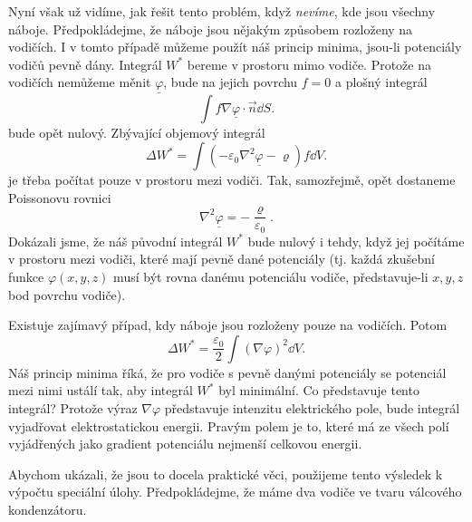     Nyní však už vidíme, jak řešit tento problém, když \emph{nevíme}, kde jsou všechny náboje.
    Předpokládejme, že náboje jsou nějakým způsobem rozloženy na vodičích. I v tomto případě můžeme
    použít náš princip minima, jsou-li potenciály vodičů pevně dány. Integrál \(W^*\) bereme v
    prostoru mimo vodiče. Protože na vodičích nemůžeme měnit \(\underline{\varphi}\), bude na jejich
    povrchu \(f= 0\) a plošný integrál
    \begin{equation*}
      \int f\nabla\underline{\varphi}\cdot\vec{n}\dd{S}.
    \end{equation*}
    bude opět nulový. Zbývající objemový integrál
    \begin{equation*}
      \Delta W^* = \int(-\varepsilon_0\nabla^2\underline{\varphi} - \varrho)f\dd{V}.
    \end{equation*}
    je třeba počítat pouze v prostoru mezi vodiči. Tak, samozřejmě, opět dostaneme Poissonovu
    rovnici
    \begin{equation*}
      \nabla^2\underline{\varphi} = -\dfrac{\varrho}{\varepsilon_0}.
    \end{equation*}
    Dokázali jsme, že náš původní integrál \(W^*\) bude nulový i tehdy, když jej počítáme v prostoru
    mezi vodiči, které mají pevně dané potenciály (tj. každá zkušební funkce \(\varphi(x, y, z)\)
    musí být rovna danému potenciálu vodiče, představuje-li \(x, y, z\) bod povrchu vodiče). 
    
    Existuje zajímavý případ, kdy náboje jsou rozloženy pouze na vodičích. Potom
    \begin{equation*}
      \Delta W^* = \dfrac{\varepsilon_0}{2}\int(\nabla\varphi)^2\dd{V}.
    \end{equation*}
    Náš princip minima říká, že pro vodiče s pevně danými potenciály se potenciál mezi nimi ustálí
    tak, aby integrál \(W^*\) byl minimální. Co představuje tento integrál? Protože výraz
    \(\nabla\varphi\) představuje intenzitu elektrického pole, bude integrál vyjadřovat
    elektrostatickou energii. Pravým polem je to, které má ze všech polí vyjádřených jako gradient
    potenciálu nejmenší celkovou energii. 
    

    Abychom ukázali, že jsou to docela praktické věci, použijeme tento výsledek k výpočtu speciální
    úlohy. Předpokládejme, že máme dva vodiče ve tvaru válcového kondenzátoru.

